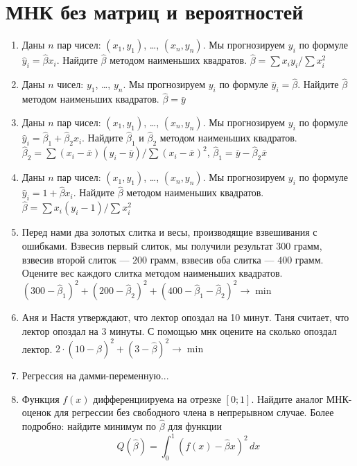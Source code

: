 \documentclass[pdftex,12pt,a4paper]{article}
\def \hb{\hat{\beta}}
\def \hy{\hat{y}}
\newcommand{\solution}[1]{ {\tiny #1} }
\newcommand{\problem}[1]{#1}
\begin{document}
\section{МНК без матриц и вероятностей}

\begin{enumerate}
\item \problem{Даны $n$ пар чисел: $(x_1, y_1)$, \ldots, $(x_n,y_n)$. Мы прогнозируем $y_i$ по формуле $\hy_i=\hb x_i$. Найдите $\hb$ методом наименьших квадратов. }
\solution{$\hb=\sum x_i y_i/\sum x_i^2$}

\item \problem{Даны $n$ чисел: $y_1$, \ldots, $y_n$. Мы прогнозируем $y_i$ по формуле $\hy_i=\hb$. Найдите $\hb$ методом наименьших квадратов. }
\solution{$\hb=\bar{y}$}

\item \problem{Даны $n$ пар чисел: $(x_1, y_1)$, \ldots, $(x_n,y_n)$. Мы прогнозируем $y_i$ по формуле $\hy_i=\hb_1+\hb_2 x_i$. Найдите $\hb_1$ и $\hb_2$ методом наименьших квадратов. }
\solution{$\hb_2=\sum (x_i-\bar{x})(y_i-\bar{y})/\sum(x_i-\bar{x})^2$, $\hb_1=\bar{y}-\hb_2\bar{x}$}

\item \problem{Даны $n$ пар чисел: $(x_1, y_1)$, \ldots, $(x_n,y_n)$. Мы прогнозируем $y_i$ по формуле $\hy_i=1+\hb x_i$. Найдите $\hb$ методом наименьших квадратов. }
\solution{$\hb=\sum x_i (y_i-1)/\sum x_i^2$}

\item \problem{ Перед нами два золотых слитка и весы, производящие взвешивания с ошибками. Взвесив первый слиток, мы получили результат $300$ грамм, взвесив второй слиток --- $200$ грамм, взвесив оба слитка --- $400$ грамм. Оцените вес каждого слитка методом наименьших квадратов.}
\solution{ $(300-\hb_1)^2+(200-\hb_2)^2+(400-\hb_1-\hb_2)^2\to\min$ }


\item Аня и Настя утверждают, что лектор опоздал на 10 минут. Таня считает, что лектор опоздал на 3 минуты. С помощью мнк оцените на сколько опоздал лектор. 
\solution{ $2\cdot (10-\hb)^2+(3-\hb)^2\to\min$ }

\item Регрессия на дамми-переменную...



\item Функция $f(x)$ дифференциируема на отрезке $[0;1]$. Найдите аналог МНК-оценок для регрессии без свободного члена в непрерывном случае. Более подробно: найдите минимум по $\hb$ для функции
\begin{equation}
Q(\hb)= \int_0^1 (f(x)-\hb x)^2\,dx
\end{equation}
\solution{}


\end{enumerate}
\end{document}
